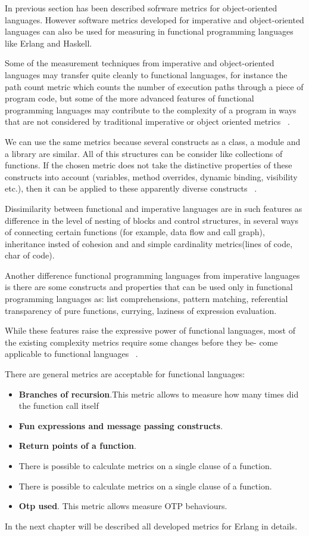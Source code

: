 In previous section has been described sofrware metrics for object-oriented languages. However software metrics developed for imperative and object-oriented languages can also be used for measuring in functional programming languages like Erlang and Haskell.

Some  of  the  measurement  techniques  from  imperative  and object-oriented  languages  may  transfer  quite  cleanly  to  functional  languages,  for  instance  the  path  count  metric  which  counts  the  number  of  execution  paths through  a  piece  of  program  code,  but  some  of  the  more  advanced features  of  functional  programming  languages  may contribute  to  the  complexity  of  a  program  in  ways  that  are  not  considered  by  traditional  imperative  or  object  oriented 
metrics ~\cite{fp}. 

We can use the same metrics because several constructs as a class, a module and a library are similar. All of this structures can be consider like collections of functions. If the chosen metric does not take the distinctive properties of these constructs into account (variables, method overrides, dynamic binding, visibility etc.), then it can be applied to these apparently diverse constructs ~\cite{metrics3}.

Dissimilarity between functional and imperative languages are in such features as difference in the level of nesting of blocks and control
structures, in several ways of connecting certain functions (for example, data flow and call graph), inheritance insted of cohesion and and simple cardinality metrics(lines of code, char of code).


Another difference functional programming languages from imperative languages is there are some constructs and properties that can be used only in functional programming languages as: list comprehensions, pattern matching, referential transparency of pure functions, currying, laziness of expression evaluation.

While these features raise the expressive power of functional languages,
most of the existing complexity metrics require some changes before they be-
come applicable to functional languages ~\cite{metrics3}.

There are general metrics are acceptable for functional languages:
\begin{itemize}
	\item \textbf{Branches of recursion}.This metric allows to measure how many times did the function call itself
	\item \textbf{Fun expressions and message passing constructs}.
	\item \textbf{Return points of a function}.
	\item There is possible to calculate metrics on a single clause of a function.
	\item There is possible to calculate metrics on a single clause of a function.
	\item \textbf{Otp used}. This metric allows measure OTP behaviours.
\end{itemize}

In the next chapter will be described all developed metrics for Erlang in details.




